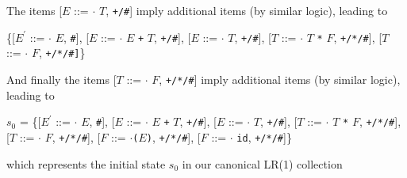 \documentclass[8pt,a4paper,compress]{beamer}
\newcommand{\mm}[1]{$#1$}
\newcommand{\expo}[2]{$#1^{#2}$}
\newcommand{\subs}[2]{${#1}_{#2}$}
\newenvironment{spaced}
{
\smallskip
\hspace{.5cm}
\begin{minipage}[c]{\textwidth}
}
{
\end{minipage}
\smallskip
}
\begin{document}
\begin{frame}[fragile]
\pause

The items [$E$  ::= $\cdot$ $T$, \lstinline{+/#}] imply additional items (by similar logic), leading to

\text{ }
\begin{spaced}
\begin{production}
\{[\expo{E}{\prime} ::= \mm{\cdot} \mm{E}, \lstinline{#}],
  [\mm{E}  ::= \mm{\cdot} \mm{E} \lstinline{+} \mm{T}, \lstinline{+/#}],
  [\mm{E}  ::= \mm{\cdot} \mm{T}, \lstinline{+/#}],
  [\mm{T}  ::= \mm{\cdot} \mm{T}  \lstinline{*} \mm{F}, \lstinline{+/*/#}],
  [\mm{T}  ::= \mm{\cdot} \mm{F}, \lstinline{+/*/#]}\}
\end{production}
\end{spaced}

\pause

And finally the items [$T$ ::= $\cdot$ $F$, \lstinline{+/*/#}] imply additional items (by similar logic), leading to

\text{ }
\begin{spaced}
\begin{production}
\subs{s}{0} = \{[\expo{E}{\prime} ::= \mm{\cdot} \mm{E}, \lstinline{#}],
         [\mm{E}  ::= \mm{\cdot} \mm{E} \lstinline{+} \mm{T}, \lstinline{+/#}],
         [\mm{E}  ::= \mm{\cdot} \mm{T}, \lstinline{+/#}],
         [\mm{T}  ::= \mm{\cdot} \mm{T} \lstinline{*} \mm{F}, \lstinline{+/*/#}],
         [\mm{T}  ::= \mm{\cdot} \mm{F}, \lstinline{+/*/#}],
         [\mm{F}  ::= \mm{\cdot}\lstinline{(}\mm{E}\lstinline{)}, \lstinline{+/*/#}],
         [\mm{F}  ::= \mm{\cdot} \lstinline{id}, \lstinline{+/*/#}]\}
\end{production}
\end{spaced}

\noindent which represents the initial state $s_0$ in our canonical LR(1) collection
\end{frame}
\end{document}
